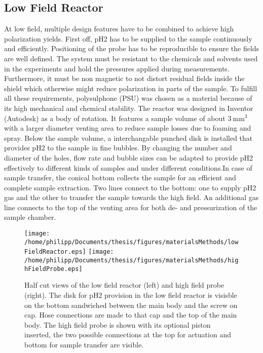 		\subsection{Low Field Reactor}
			At low field, multiple design features have to be combined to achieve high polarization
			yields. First off, pH2 has to be supplied to the sample continuously and efficiently.
			Positioning of the probe has to be reproducible to ensure the fields are well defined.
			The system must be resistant to the chemicals and solvents used in the experiments and
			hold the pressures applied during measurements. Furthermore, it must be non magnetic to
			not distort residual fields inside the shield which otherwise might reduce polarization
			in parts of the sample. To fulfill all these requirements, polysulphone (PSU) was chosen
			as a material because of its high mechanical and chemical stability. The reactor was
			designed in Inventor (Autodesk) as a body of rotation. It features a sample volume of
			about $\SI{3}{\mm\cubed}$ with a larger diameter venting area to reduce sample losses
			due to foaming and spray. Below the sample volume, a interchangable punched disk is installed
			that provides pH2 to the sample in fine bubbles. By changing the number and diameter of
			the holes, flow rate and bubble sizes can be adapted to provide pH2 effectively to
			different kinds of samples and under different conditions.In case of sample transfer,
			the conical bottom collects the sample for an efficient and complete sample extraction.
			Two lines connect to the bottom: one to supply pH2 gas and the other to transfer the
			sample towards the high field. An additional gas line connects to the top of the venting
			area for both de- and pressurization of the sample chamber.
			\begin{figure}[h]
				\texttt{[image: /home/philipp/Documents/thesis/figures/materialsMethods/lowFieldReactor.eps]}
				\texttt{[image: /home/philipp/Documents/thesis/figures/materialsMethods/highFieldProbe.eps]}
				\caption{Half cut views of the low field reactor (left) and high field probe
				(right). The disk for pH2 provision in the low field reactor is visisble on the bottom sandwiched between the
				main body and the screw on cap. Hose connections are made to that cap and the top
				of the main body. The high field probe is shown with its optional piston inserted,
				the two possible connections at the top for actuation and bottom for sample transfer
				are visible.}
			\end{figure}
